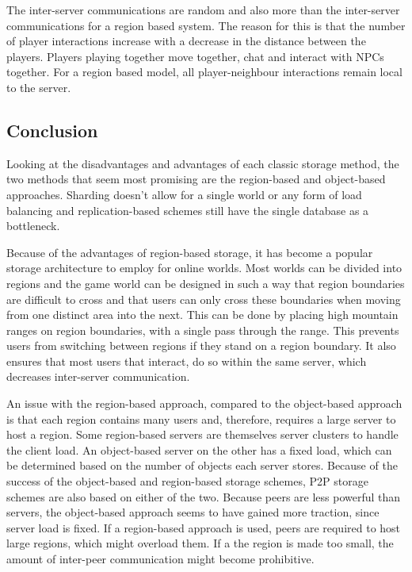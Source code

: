 The inter-server communications are random and also more than the inter-server communications for a region based system. The reason for this is that the number of player interactions increase with a decrease in the distance
between the players. Players playing together move together, chat and interact with NPCs together. For a region based model, all player-neighbour interactions remain local to the server.

\subsection{Conclusion}

Looking at the disadvantages and advantages of each classic storage method, the two methods that seem most promising are the region-based and object-based approaches. Sharding doesn't allow for a single world or any form of load balancing and replication-based schemes still have the single database as a bottleneck.

Because of the advantages of region-based storage, it has become a popular storage architecture to employ for online worlds. Most worlds can be divided into regions and the game world can be designed in such a way that region boundaries are difficult to cross and that users can only cross these boundaries when moving from one distinct area into the next. This can be done by placing high mountain ranges on region boundaries, with a single pass through the range. This prevents users from switching between regions if they stand on a region boundary. It also ensures that most users that interact, do so within the same server, which decreases inter-server communication.

An issue with the region-based approach, compared to the object-based approach is that each region contains many users and, therefore, requires a large server to host a region. Some region-based servers are themselves server clusters to handle the client load. An object-based server on the other has a fixed load, which can be determined based on the number of objects each server stores. 
Because of the success of the object-based and region-based storage schemes, P2P storage schemes are also based on either of the two. Because peers are less powerful than servers, the object-based approach seems to have gained more traction, since server load is fixed. If a region-based approach is used, peers are required to host large regions, which might overload them. If a the region is made too small, the amount of inter-peer communication might become prohibitive.

